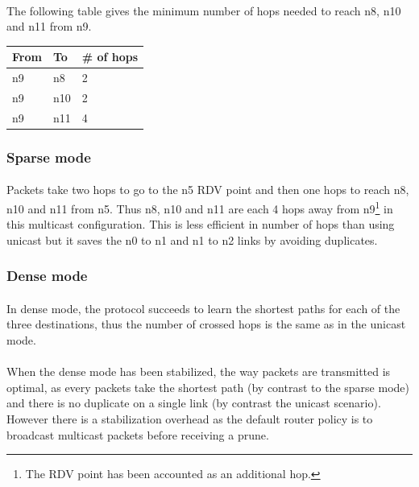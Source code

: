 \documentclass[a4paper]{article}
\begin{document}
    \paragraph{}The following table gives the minimum number of hops needed to
reach n8, n10 and n11 from n9.

    \begin{center}
            \begin{tabular}{|l|l|l|}
                \hline
                From & To & \# of hops \\
                \hline
                n9 & n8  & 2 \\
                n9 & n10 & 2 \\
                n9 & n11 & 4 \\
                \hline
            \end{tabular}
    \end{center}

   \subsubsection{Sparse mode}

    \paragraph{}Packets take two hops to go to the n5 RDV point and then one
hops to reach n8, n10 and n11 from n5. Thus n8, n10 and n11 are each 4 hops
away from n9\footnote{The RDV point has been accounted as an additional hop.} in
this multicast configuration. This is less efficient in number of hops than
using unicast but it saves the n0 to n1 and n1 to n2 links by avoiding
duplicates.

   \subsubsection{Dense mode}

    \paragraph{}In dense mode, the protocol succeeds to learn the shortest
paths for each of the three destinations, thus the number of crossed hops is
the same as in the unicast mode.

    \paragraph{}When the dense mode has been stabilized, the way packets are
transmitted is optimal, as every packets take the shortest path (by contrast to
the sparse mode) and there is no duplicate on a single link (by contrast the
unicast scenario).
\newline However there is a stabilization overhead as the default router policy
is to broadcast multicast packets before receiving a prune.
\end{document}

